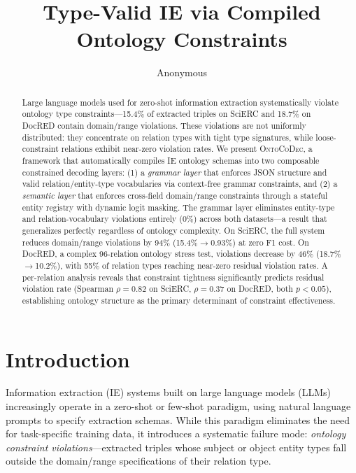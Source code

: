 \documentclass[11pt,a4paper]{article}
\title{Type-Valid IE via Compiled Ontology Constraints}
\author{Anonymous}
\date{}
\begin{document}
\maketitle

\begin{abstract}
Large language models used for zero-shot information extraction systematically violate ontology type constraints---15.4\% of extracted triples on SciERC and 18.7\% on DocRED contain domain/range violations.
These violations are not uniformly distributed: they concentrate on relation types with tight type signatures, while loose-constraint relations exhibit near-zero violation rates.
We present \textsc{OntoCoDec}, a framework that automatically compiles IE ontology schemas into two composable constrained decoding layers: (1) a \emph{grammar layer} that enforces JSON structure and valid relation/entity-type vocabularies via context-free grammar constraints, and (2) a \emph{semantic layer} that enforces cross-field domain/range constraints through a stateful entity registry with dynamic logit masking.
The grammar layer eliminates entity-type and relation-vocabulary violations entirely (0\%) across both datasets---a result that generalizes perfectly regardless of ontology complexity.
On SciERC, the full system reduces domain/range violations by 94\% (15.4\%$\to$0.93\%) at zero F1 cost.
On DocRED, a complex 96-relation ontology stress test, violations decrease by 46\% (18.7\%$\to$10.2\%), with 55\% of relation types reaching near-zero residual violation rates.
A per-relation analysis reveals that constraint tightness significantly predicts residual violation rate (Spearman $\rho{=}0.82$ on SciERC, $\rho{=}0.37$ on DocRED, both $p{<}0.05$), establishing ontology structure as the primary determinant of constraint effectiveness.
\end{abstract}

\section{Introduction}

Information extraction (IE) systems built on large language models (LLMs) increasingly operate in a zero-shot or few-shot paradigm, using natural language prompts to specify extraction schemas.
While this paradigm eliminates the need for task-specific training data, it introduces a systematic failure mode: \emph{ontology constraint violations}---extracted triples whose subject or object entity types fall outside the domain/range specifications of their relation type.
\end{document}
